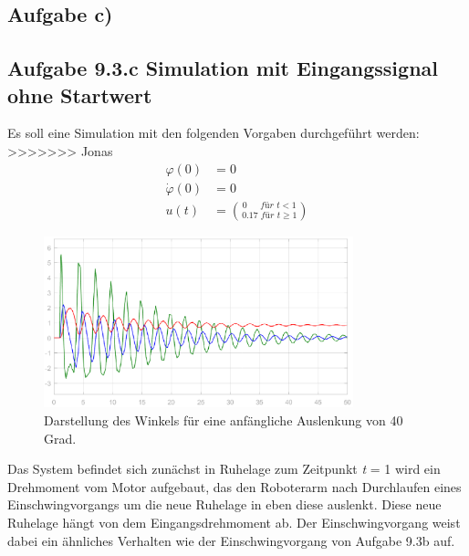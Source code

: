\documentclass[10pt]{scrartcl}
\begin{document}
\subsection{Aufgabe c)}




\subsection{Aufgabe 9.3.c  Simulation mit Eingangssignal ohne Startwert}
Es soll eine Simulation mit den folgenden Vorgaben durchgeführt werden: 
>>>>>>> Jonas
\begin{align}
\varphi  (0) &= 0 \\
\dot \varphi (0) &= 0 \\
u(t)  &= \binom{0\,\,\,\,\,\,\,\,\, für\,\, t<1}{0.17\,\, für\,\, t \geq 1}
\end{align}
%

\begin{figure}[H]
	\centering
	\includegraphics[width=0.8\textwidth]{9c}
	\caption{Darstellung des Winkels für eine anfängliche Auslenkung von 40 Grad. }
	\label{img:grafik-dummy}
\end{figure}

Das System befindet sich zunächst in Ruhelage zum Zeitpunkt \textit t = 1 wird ein Drehmoment vom Motor aufgebaut,
das den Roboterarm nach Durchlaufen eines Einschwingvorgangs um die neue Ruhelage in eben diese auslenkt.
Diese neue Ruhelage hängt von dem Eingangsdrehmoment ab. Der Einschwingvorgang weist dabei ein ähnliches Verhalten wie der Einschwingvorgang von Aufgabe 9.3b auf.
\end{document}
